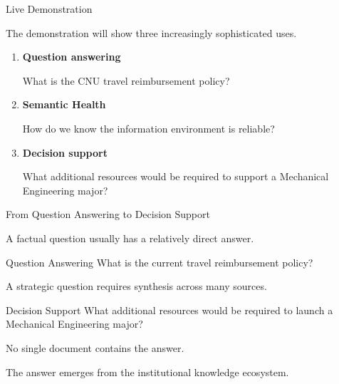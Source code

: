 \documentclass[aspectratio=169]{beamer}
\begin{document}
\begin{frame}{Live Demonstration}

\Large

The demonstration will show three increasingly sophisticated uses.

\vspace{0.7cm}

\begin{enumerate}

\item \textbf{Question answering}

\smallskip

What is the CNU travel reimbursement policy?

\vspace{0.5cm}

\item \textbf{Semantic Health}

\smallskip

How do we know the information environment is reliable?

\vspace{0.5cm}

\item \textbf{Decision support}

\smallskip

What additional resources would be required to support a
Mechanical Engineering major?

\end{enumerate}

\end{frame}

\begin{frame}{From Question Answering to Decision Support}

A factual question usually has a relatively direct answer.

\vspace{0.4cm}

\begin{block}{Question Answering}
What is the current travel reimbursement policy?
\end{block}

\vspace{0.5cm}

A strategic question requires synthesis across many sources.

\vspace{0.4cm}

\begin{block}{Decision Support}
What additional resources would be required to launch a
Mechanical Engineering major?
\end{block}

\vspace{0.5cm}

No single document contains the answer.

The answer emerges from the institutional knowledge ecosystem.

\end{frame}
\end{document}
